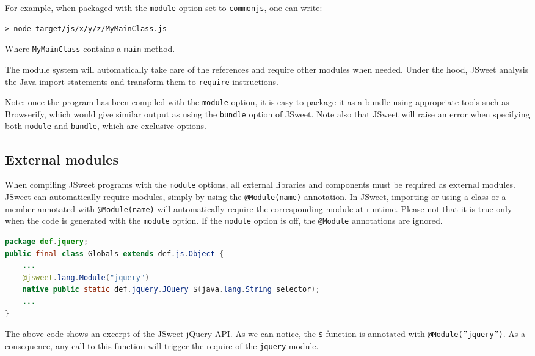 \documentclass[a4paper]{report}
\begin{document}
For example, when packaged with the \texttt{module} option set to \texttt{commonjs}, one can write:

\begin{lstlisting}[language=html]
> node target/js/x/y/z/MyMainClass.js
\end{lstlisting}

Where \texttt{MyMainClass} contains a \texttt{main} method. 

The module system will automatically take care of the references and require other modules when needed. Under the hood, JSweet analysis the Java import statements and transform them to \texttt{require} instructions.

Note: once the program has been compiled with the \texttt{module} option, it is easy to package it as a bundle using appropriate tools such as Browserify, which would give similar output as using the \texttt{bundle} option of JSweet. Note also that JSweet will raise an error when specifying both \texttt{module} and \texttt{bundle}, which are exclusive options.

\subsection{External modules}

When compiling JSweet programs with the \texttt{module} options, all external libraries and components must be required as external modules. JSweet can automatically require modules, simply by using the \texttt{@Module(name)} annotation. In JSweet, importing or using a class or a member annotated with \texttt{@Module(name)} will automatically require the corresponding module at runtime. Please not that it is true only when the code is generated with the \texttt{module} option. If the \texttt{module} option is off, the \texttt{@Module} annotations are ignored.

\begin{lstlisting}[language=Java]
package def.jquery;
public final class Globals extends def.js.Object {
	...
	@jsweet.lang.Module("jquery")
	native public static def.jquery.JQuery $(java.lang.String selector);
	...
}
\end{lstlisting}

The above code shows an excerpt of the JSweet jQuery API. As we can notice, the \texttt{\$} function is annotated with \texttt{@Module($"$jquery$"$)}. As a consequence, any call to this function will trigger the require of the \texttt{jquery} module.
\end{document}
